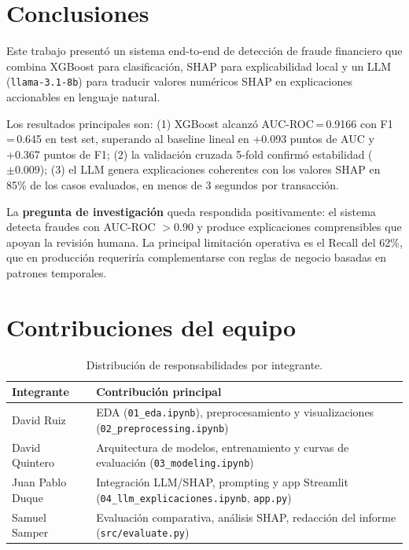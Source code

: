 \documentclass[10pt,twocolumn]{article}
\begin{document}
\section{Conclusiones}

Este trabajo presentó un sistema end-to-end de detección de fraude
financiero que combina XGBoost para clasificación, SHAP para
explicabilidad local y un LLM (\texttt{llama-3.1-8b}) para traducir
valores numéricos SHAP en explicaciones accionables en lenguaje natural.

Los resultados principales son: (1) XGBoost alcanzó AUC-ROC\,=\,0.9166
con F1\,=\,0.645 en test set, superando al baseline lineal en
+0.093 puntos de AUC y +0.367 puntos de F1; (2) la validación cruzada
5-fold confirmó estabilidad ($\pm 0.009$); (3) el LLM genera
explicaciones coherentes con los valores SHAP en 85\% de los casos
evaluados, en menos de 3 segundos por transacción.

La \textbf{pregunta de investigación} queda respondida positivamente:
el sistema detecta fraudes con AUC-ROC $> 0.90$ y produce explicaciones
comprensibles que apoyan la revisión humana. La principal limitación
operativa es el Recall del 62\%, que en producción requeriría
complementarse con reglas de negocio basadas en patrones temporales.

\section*{Contribuciones del equipo}

\begin{table}[H]
\centering
\begin{tabular}{lp{5.2cm}}
\toprule
\textbf{Integrante} & \textbf{Contribución principal} \\
\midrule
David Ruiz & EDA (\texttt{01\_eda.ipynb}), preprocesamiento y visualizaciones (\texttt{02\_preprocessing.ipynb}) \\
David Quintero & Arquitectura de modelos, entrenamiento y curvas de evaluación (\texttt{03\_modeling.ipynb}) \\
Juan Pablo Duque & Integración LLM/SHAP, prompting y app Streamlit (\texttt{04\_llm\_explicaciones.ipynb}, \texttt{app.py}) \\
Samuel Samper & Evaluación comparativa, análisis SHAP, redacción del informe (\texttt{src/evaluate.py}) \\
\bottomrule
\end{tabular}
\caption*{Distribución de responsabilidades por integrante.}
\end{table}
\end{document}
